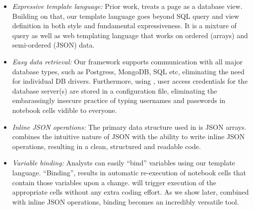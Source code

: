 \begin{itemize}
	\item \textit{Expressive template language:} Prior work, treats a page as a database view. Building on that, our template language goes beyond SQL query and view definition in both style and fundamental expressiveness. It is a mixture of query as well as web templating language that works on ordered (arrays) and semi-ordered (JSON) data. 
	\item \textit{Easy data retrieval:} Our framework supports communication with all major database types, such as Postgress, MongoDB, SQL etc, eliminating the need for individual DB drivers. Furthermore, using {\projname}, user access credentials for the database server(s) are stored in a configuration file, eliminating the embarassingly insecure practice of typing usernames and passwords in notebook cells vidible to everyone.
	\item \textit{Inline JSON operations:} The primary data structure used in {\projname} is JSON arrays. {\projname} combines the intuitive nature of JSON with the ability to write inline JSON operations, resulting in a clean, structured and readable code.
	\item \textit{Variable binding:} Analysts can easily ``bind'' variables using our template language. ``Binding'', results in automatic re-execution of notebook cells that contain those variables upon a change. {\projname} will trigger execution of the appropriate cells without any extra coding effort. As we show later, combined with inline JSON operations, binding becomes an incredibly versatile tool.

\end{itemize}




